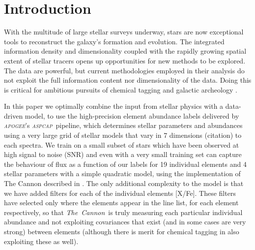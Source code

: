 \documentclass[12pt, preprint]{aastex}
\newcommand{\project}[1]{\textsl{#1}}
\newcommand{\tc}{\project{The~Cannon}}
\newcommand{\apogee}{\project{\textsc{apogee}}}
\newcommand{\aspcap}{\project{\textsc{aspcap}}}
\begin{document}
\begin{abstract}


\end{abstract}


\section{Introduction}\label{sec:Intro}

With the multitude of large stellar surveys underway, stars are now exceptional tools to reconstruct the galaxy's formation and evolution. 
The integrated information density and dimensionality coupled with the rapidly growing spatial extent of stellar tracers opens up opportunities for new methods to be explored. The data are powerful, but current methodologies employed in their analysis do not exploit the full information content nor dimensionality of the data. Doing this is critical for ambitious pursuits of chemical tagging \citep[e.g.][]{Ting2015} and galactic archeology \citep{Freeman2002, Martell2015}. 

In this paper we optimally combine the input from stellar physics with a data-driven model, to use the high-precision element abundance labels delivered by \apogee's \aspcap\ pipeline, which determines stellar parameters and abundances using a very large grid of stellar models that vary in 7 dimensions (citation) to each spectra. We train on a small subset of stars which have been observed at high signal to noise (SNR) and even with a very small training set can capture the behaviour of flux as a function of our labels for 19 individual elements and 4 stellar parameters with a simple quadratic model, using the implementation of The Cannon described in \citet{Ness2015}. The only additional complexity to the model is that we have added filters for each of the individual elements [X/Fe]. These filters have selected only where the elements appear in the line list, for each element respectively, so that \tc\ is truly measuring each particular individual abundance and not exploiting covariances that exist (and in some cases are very strong) between elements (although there is merit for chemical tagging in also exploiting these as well). 
\end{document}
